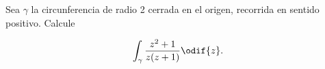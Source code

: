 \documentclass[../main.tex]{subfiles}
\begin{document}
\begin{problema}
    Sea \(\gamma\) la circunferencia de radio 2 cerrada en el origen, recorrida en
    sentido positivo. Calcule

    \begin{equation*}
        \int_{\gamma}^{}\dfrac{z^{2} + 1}{z(z + 1)}\odif{z}.
    \end{equation*}
\end{problema}
\end{document}
